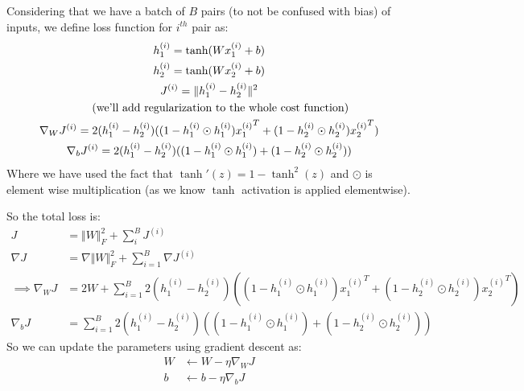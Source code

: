 \documentclass[]{article}
\numberwithin{equation}{section}
\newcommand{\norm}[2][]{\Vert #2\Vert_{#1}}
\newcommand{\transpose}{^T}
\begin{document}
\subsection{}
Considering that we have a batch of \(B\) pairs (to not be confused with bias) of inputs, we define loss function for \(i^{th}\) pair as:
\begin{gather}
h_1^{(i)} = \tanh(Wx_1^{(i)} + b)\\
h_2^{(i)} = \tanh(Wx_2^{(i)} + b)\\
J^{(i)} = \norm{h_1^{(i)} - h_2^{(i)}}^2\\
\tag*{(\textup{we'll add regularization to the whole cost function})}\\
\nabla_W J^{(i)} = 2(h_1^{(i)} - h_2^{(i)})((1 - h_1^{(i)}\odot h_1^{(i)}){x_1^{(i)}}\transpose + (1 - h_2^{(i)}\odot h_2^{(i)}){x_2^{(i)}}\transpose)\\ 
\nabla_b J^{(i)} = 2(h_1^{(i)} - h_2^{(i)})((1 - h_1^{(i)}\odot h_1^{(i)}) + (1 - h_2^{(i)}\odot h_2^{(i)}))
\end{gather}
Where we have used the fact that \(\tanh'(z) = 1 - \tanh^2(z)\) and \(\odot\) is element wise multiplication (as we know \(\tanh\) activation is applied elementwise).

So the total loss is:
\begin{align}
J &= \norm[F]{W}^2 + \sum_{i}^B J^{(i)}\\
\nabla J &= \nabla \norm[F]{W}^2 + \sum_{i=1}^B \nabla J^{(i)}\\
\implies \nabla_W J &= 2W + \sum_{i=1}^B 2(h_1^{(i)} - h_2^{(i)})((1 - h_1^{(i)}\odot h_1^{(i)}){x_1^{(i)}}\transpose + (1 - h_2^{(i)}\odot h_2^{(i)}){x_2^{(i)}}\transpose)\\
\nabla_b J &= \sum_{i=1}^B 2(h_1^{(i)} - h_2^{(i)})((1 - h_1^{(i)}\odot h_1^{(i)}) + (1 - h_2^{(i)}\odot h_2^{(i)}))
\end{align}
So we can update the parameters using gradient descent as:
\begin{align}
W &\leftarrow W - \eta \nabla_W J\\
b &\leftarrow b - \eta \nabla_b J
\end{align}
\end{document}
